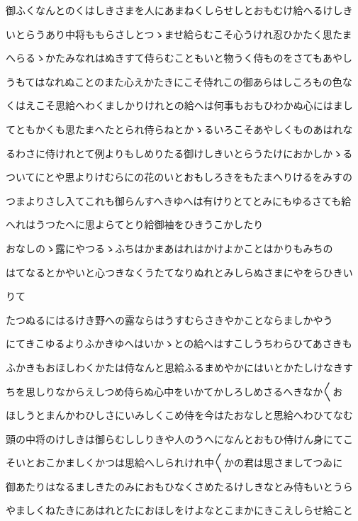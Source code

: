 \documentclass[a4paper,11pt,landscape]{ltjtarticle}
\begin{document}
御ふくなんとのくはしきさまを人にあまねくしらせしとおもむけ給へるけしき
\par\medskip
いとらうあり中将ももらさしとつゝませ給らむこそ心うけれ忍ひかたく思たま
\par\medskip
へらるゝかたみなれはぬきすて侍らむこともいと物うく侍ものをさてもあやし
\par\medskip
うもてはなれぬことのまた心えかたきにこそ侍れこの御あらはしころもの色な
\par\medskip
くはえこそ思給へわくましかりけれとの給へは何事もおもひわかぬ心にはまし
\par\medskip
てともかくも思たまへたとられ侍らねとかゝるいろこそあやしくものあはれな
\par\medskip
るわさに侍けれとて例よりもしめりたる御けしきいとらうたけにおかしかゝる
\par\medskip
ついてにとや思よりけむらにの花のいとおもしろきをもたまへりけるをみすの
\par\medskip
つまよりさし入てこれも御らんすへきゆへは有けりとてとみにもゆるさても給
\par\medskip
へれはうつたへに思よらてとり給御袖をひきうこかしたり
\par\medskip
おなしのゝ露にやつるゝふちはかまあはれはかけよかことはかりもみちの
\par\medskip
はてなるとかやいと心つきなくうたてなりぬれとみしらぬさまにやをらひきい
\par\medskip
りて
\par\medskip
たつぬるにはるけき野への露ならはうすむらさきやかことならましかやう
\par\medskip
にてきこゆるよりふかきゆへはいかゝとの給へはすこしうちわらひてあさきも
\par\medskip
ふかきもおほしわくかたは侍なんと思給ふるまめやかにはいとかたしけなきす
\par\medskip
ちを思しりなからえしつめ侍らぬ心中をいかてかしろしめさるへきなか〱お
\par\medskip
ほしうとまんかわひしさにいみしくこめ侍を今はたおなしと思給へわひてなむ
\par\medskip
頭の中将のけしきは御らむししりきや人のうへになんとおもひ侍けん身にてこ
\par\medskip
そいとおこかましくかつは思給へしられけれ中〱かの君は思さましてつゐに
\par\medskip
御あたりはなるましきたのみにおもひなくさめたるけしきなとみ侍もいとうら
\par\medskip
やましくねたきにあはれとたにおほしをけよなとこまかにきこえしらせ給こと
\par\medskip
\end{document}
